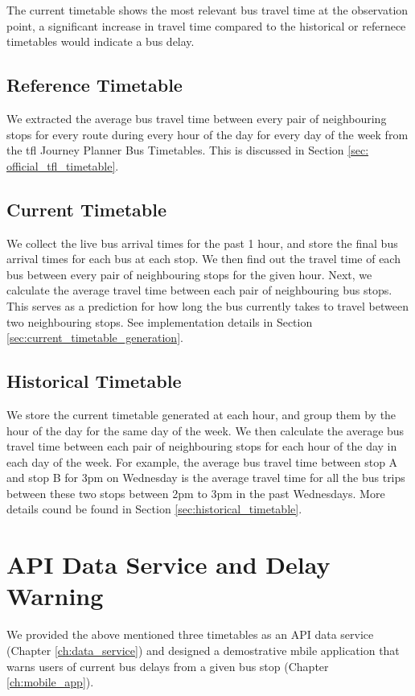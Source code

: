 \par The current timetable shows the most relevant bus travel time at the observation point, a significant increase in travel time compared to the historical or refernece timetables would indicate a bus delay.

\subsection{Reference Timetable}
\par We extracted the average bus travel time between every pair of neighbouring stops for every route during every hour of the day for every day of the week from the \acrshort{tfl} Journey Planner Bus Timetables. This is discussed in Section \ref{sec: official_tfl_timetable}.

\subsection{Current Timetable}
\par We collect the live bus arrival times for the past 1 hour, and store the final bus arrival times for each bus at each stop. We then find out the travel time of each bus between every pair of neighbouring stops for the given hour. Next, we calculate the average travel time between each pair of neighbouring bus stops. This serves as a prediction for how long the bus currently takes to travel between two neighbouring stops. See implementation details in Section \ref{sec:current_timetable_generation}.

\subsection{Historical Timetable}
\par We store the current timetable generated at each hour, and group them by the hour of the day for the same day of the week. We then calculate the average bus travel time between each pair of neighbouring stops for each hour of the day in each day of the week. For example, the average bus travel time between stop A and stop B for 3pm on Wednesday is the average travel time for all the bus trips between these two stops between 2pm to 3pm in the past Wednesdays. More details cound be found in Section \ref{sec:historical_timetable}.

\section{API Data Service and Delay Warning}
\par We provided the above mentioned three timetables as an API data service (Chapter \ref{ch:data_service}) and designed a demostrative mbile application that warns users of current bus delays from a given bus stop (Chapter \ref{ch:mobile_app}).





